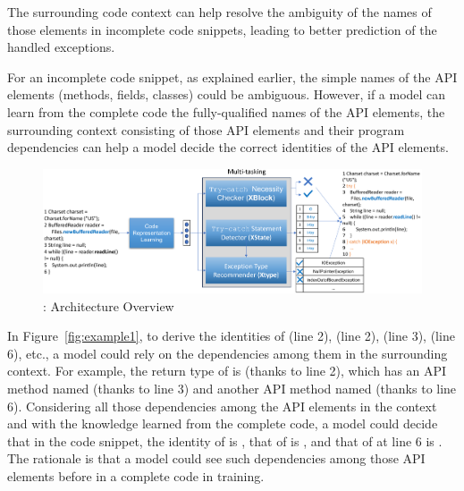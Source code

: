 \begin{Observation} 
\label{ob4}
The surrounding code context can help resolve the ambiguity of the
names of those elements in incomplete code snippets, leading to
better prediction of the handled exceptions.
\end{Observation}

For an incomplete code snippet, as explained earlier, the simple names
of the API elements (methods, fields, classes) could be ambiguous.
However, if a model can learn from the complete code the
fully-qualified names of the API elements, the surrounding context
consisting of those API elements and their program dependencies can
help a model decide the correct identities of the API elements.




\begin{figure}[htp]
\begin{center}
\includegraphics[width=5.6in]{overview-4.png}
\vspace{-10pt}
\caption{{\tool}: Architecture Overview}
\label{overview}
\end{center}
\end{figure}

In Figure~\ref{fig:example1}, to derive the identities of
 (line 2),  (line 2),
 (line 3),  (line 6), etc., a model
could rely on the dependencies among them in the surrounding context.
For example, the return type of  is
 (thanks to line 2), which has an API method named
 (thanks to line 3) and another API method named
 (thanks to line 6). Considering all those dependencies among
the API elements in the context and with the knowledge learned from
the complete code, a model could decide that in the code snippet, the identity of
 is , that of
 is
, and that of 
 at line 6 is
. The rationale is that a
model could see such dependencies among those API elements before in
a complete code in training.





